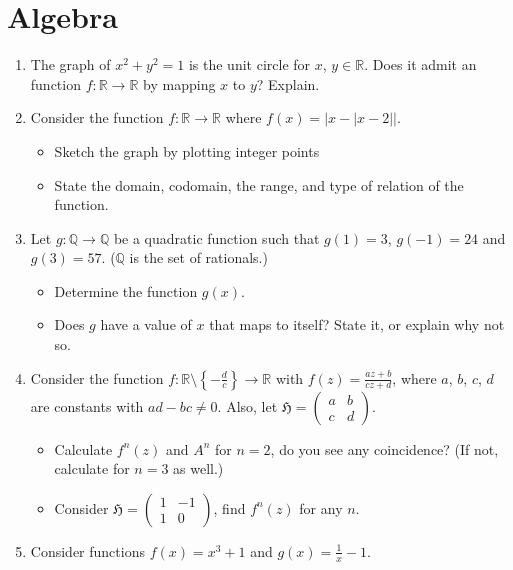 \documentclass{article}
\begin{document}
\section{Algebra}
\begin{enumerate}
\item The graph of $x^2+y^2=1$ is the unit circle for $x$, $y\in\mathbb{R}$. Does it admit an function $f:\mathbb{R}\to\mathbb{R}$ by mapping $x$ to $y$? Explain.
\item Consider the function $f:\mathbb{R}\to\mathbb{R}$ where $f(x)=|x-|x-2||$. 
       \begin{itemize}
              \item[(a)] Sketch the graph by plotting integer points
              \item[(b)] State the domain, codomain, the range, and type of relation of the function.
       \end{itemize}
\item Let $g:\mathbb{Q}\to\mathbb{Q}$ be a quadratic function such that $g(1)=3$, $g(-1)=24$ and $g(3)=57$. ($\mathbb{Q}$ is the set of rationals.)
       \begin{itemize}
              \item[(a)] Determine the function $g(x)$.
              \item[(b)] Does $g$ have a value of $x$ that maps to itself? State it, or explain why not so.
       \end{itemize}
\item Consider the function $\displaystyle f:\mathbb{R}\setminus\left\{-\frac{d}{c}\right\}\to\mathbb{R}$ with $\displaystyle f(z)=\frac{az+b}{cz+d}$, where $a$, $b$, $c$, $d$ are constants with $ad-bc\neq 0$. Also, let $\mathfrak{H} = \begin{pmatrix}a & b \\c & d\end{pmatrix}$.
       \begin{itemize}
              \item[(a)] Calculate $f^n(z)$ and $A^n$ for $n=2$, do you see any coincidence? (If not, calculate for $n=3$ as well.)
              \item[(b)] Consider $\mathfrak{H} = \begin{pmatrix}1 & -1 \\1 & 0\end{pmatrix}$, find $f^n(z)$ for any $n$.
       \end{itemize}
\item Consider functions $f(x)=x^3+1$ and $g(x)=\frac{1}{x}-1$.

\end{enumerate}
\end{document}
